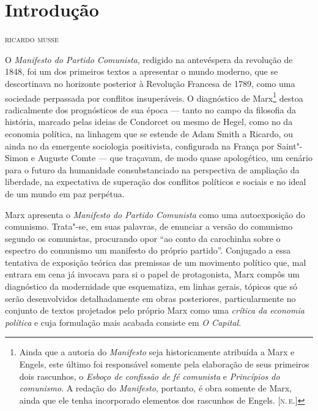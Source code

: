 \chapter*{Introdução\smallskip{}}

\begin{flushright}
\textsc{ricardo musse}
\end{flushright}

\noindent{}O \textit{Manifesto do Partido Comunista}, redigido na antevéspera da
revolução de 1848, foi um dos primeiros textos a apresentar o mundo
moderno, que se descortinava no horizonte posterior à Revolução
Francesa de 1789, como uma sociedade perpassada por conflitos
insuperáveis. O diagnóstico de Marx\footnote{Ainda que a autoria do \textit{Manifesto} 
seja historicamente atribuída a Marx e Engels, este último foi responsável somente pela 
elaboração de seus primeiros dois rascunhos, o \textit{Esboço de confissão de fé comunista} e \textit{Princípios do comunismo}. 
A redação do \textit{Manifesto}, portanto, é obra somente de Marx, ainda que ele tenha incorporado 
elementos dos rascunhos de Engels. [\textsc{n.\,e.}]} destoa radicalmente dos
prognósticos de sua época --- tanto no campo da filosofia da história,
marcado pelas ideias de Condorcet ou mesmo de Hegel, como no da
economia política, na linhagem que se estende de Adam Smith a Ricardo,
ou ainda no da emergente sociologia positivista, configurada na França
por Saint"-Simon e Auguste Comte --- que traçavam, de modo quase
apologético, um cenário para o futuro da humanidade consubstanciado na
perspectiva de ampliação da liberdade, na expectativa de superação dos
conflitos políticos e sociais e no ideal de um mundo em paz perpétua.

Marx apresenta o \textit{Manifesto do Partido Comunista} como uma
autoexposição do comunismo. Trata"-se, em suas palavras, de
enunciar a versão do comunismo segundo os comunistas, procurando opor
``ao conto da carochinha sobre o espectro do comunismo um manifesto do próprio partido''.
Conjugado a essa tentativa de exposição teórica das premissas de um
movimento político que, mal entrara em cena já invocava para si o papel
de protagonista, Marx compôs um diagnóstico da modernidade que
esquematiza, em linhas gerais, tópicos que só serão desenvolvidos
detalhadamente em obras posteriores, particularmente no conjunto de
textos projetados pelo próprio Marx como uma \textit{crítica da economia
política} e cuja formulação mais acabada consiste em \textit{O
Capital}.

